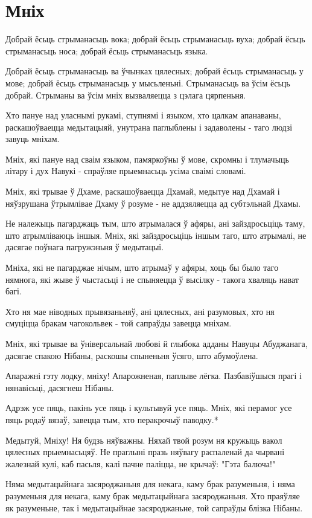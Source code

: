 \documentclass{article}
\begin{document}
\section{Мніх}

Добрай ёсьць стрыманасьць вока; добрай ёсьць стрыманасьць вуха;
добрай ёсьць стрыманасьць носа; добрай ёсьць стрыманасьць языка.

Добрай ёсьць стрыманасьць ва ўчынках цялесных; добрай ёсьць
стрыманасьць у мове; добрай ёсьць стрыманасьць у мысьленьні.
Стрыманасьць ва ўсім ёсьць добрай. Стрыманы ва ўсім мніх вызваляецца з
цэлага цярпеньня.

Хто пануе над уласнымі рукамі, ступнямі і языком, хто цалкам
апанаваны, раскашоўваецца медытацыяй, унутрана паглыблены і задаволены -
таго людзі завуць мніхам.

Мніх, які пануе над сваім языком, памяркоўны ў мове, скромны і
тлумачыць літару і дух Навукі - спраўляе прыемнасьць усіма сваімі
словамі.

Мніх, які трывае ў Дхаме, раскашоўваецца Дхамай, медытуе над Дхамай
і няўзрушана ўтрымлівае Дхаму ў розуме - не аддзяляецца ад субтэльнай
Дхамы.

Не належыць пагарджаць тым, што атрымалася ў афяры, ані
зайздросьціць таму, што атрымліваюць іншыя. Мніх, які зайздросьціць
іншым таго, што атрымалі, не дасягае поўнага пагружэньня ў медытацыі.

Мніха, які не пагарджае нічым, што атрымаў у афяры, хоць бы было
таго нямнога, які жыве ў чыстасьці і не спыняецца ў высілку - такога
хваляць нават багі.

Хто ня мае ніводных прывязаньняў, ані цялесных, ані разумовых, хто
ня смуціцца бракам чагокольвек - той сапраўды завецца мніхам.

Мніх, які трывае ва ўніверсальнай любові й глыбока адданы Навуцы
Абуджанага, дасягае спакою Нібаны, раскошы спыненьня ўсяго, што
абумоўлена.

Апаражні гэту лодку, мніху! Апарожненая, паплыве лёгка.
Пазбавіўшыся прагі і нянавісьці, дасягнеш Нібаны.

Адрэж усе пяць, пакінь усе пяць і культывуй усе пяць. Мніх, які
перамог усе пяць родаў вязаў, завецца тым, хто перакрочыў паводку.*

Медытуй, Мніху! Ня будзь няўважны. Няхай твой розум ня кружыць
вакол цялесных прыемнасьцяў. Не праглыні празь няўвагу распаленай да
чырвані жалезнай кулі, каб пасьля, калі пачне паліцца, не крычаў: "Гэта
балюча!"

Няма медытацыйнага засяроджаньня для некага, каму брак разуменьня,
і няма разуменьня для некага, каму брак медытацыйнага засяроджаньня. Хто
праяўляе як разуменьне, так і медытацыйнае засяроджаньне, той сапраўды
блізка Нібаны.
\end{document}
